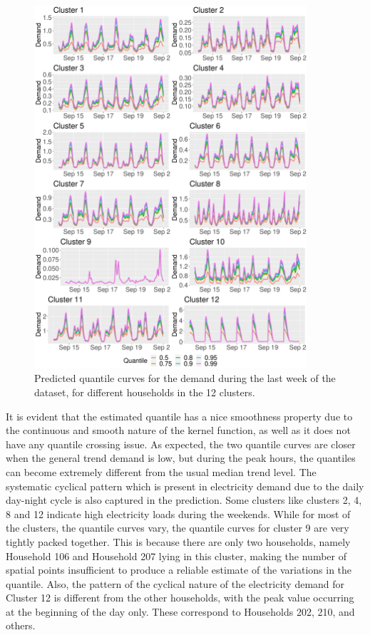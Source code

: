 \documentclass[aos]{imsart}
\theoremstyle{plain}
\theoremstyle{remark}
\begin{document}
\begin{figure}[!ht]
    \centering
    \includegraphics[width=0.9\textwidth,keepaspectratio]{prediction_plot.pdf}
    \caption{Predicted quantile curves for the demand during the last week of the dataset, for different households in the 12 clusters.}
    \label{fig:estimate-cluster}
\end{figure}

It is evident that the estimated quantile has a nice smoothness property due to the continuous and smooth nature of the kernel function, as well as it does not have any quantile crossing issue. As expected, the two quantile curves are closer when the general trend demand is low, but during the peak hours, the quantiles can become extremely different from the usual median trend level. The systematic cyclical pattern which is present in electricity demand due to the daily day-night cycle is also captured in the prediction. Some clusters like clusters 2, 4, 8 and 12 indicate high electricity loads during the weekends. While for most of the clusters, the quantile curves vary, the quantile curves for cluster 9 are very tightly packed together. This is because there are only two households, namely Household 106 and Household 207 lying in this cluster, making the number of spatial points insufficient to produce a reliable estimate of the variations in the quantile. Also, the pattern of the cyclical nature of the electricity demand for Cluster 12 is different from the other households, with the peak value occurring at the beginning of the day only. These correspond to Households 202, 210, and others.
\end{document}
